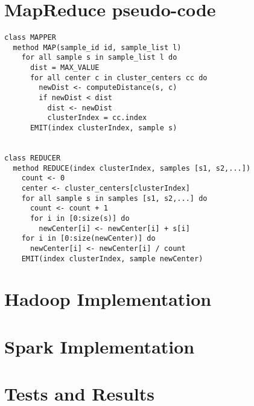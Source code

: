 \documentclass[a4paper, oneside]{article}
\begin{document}
\section{MapReduce pseudo-code}
\begin{verbatim}
class MAPPER
  method MAP(sample_id id, sample_list l)
    for all sample s in sample_list l do
      dist = MAX_VALUE
      for all center c in cluster_centers cc do
        newDist <- computeDistance(s, c)
        if newDist < dist
          dist <- newDist
          clusterIndex = cc.index
      EMIT(index clusterIndex, sample s)


class REDUCER
  method REDUCE(index clusterIndex, samples [s1, s2,...])
    count <- 0
    center <- cluster_centers[clusterIndex]
    for all sample s in samples [s1, s2,...] do
      count <- count + 1
      for i in [0:size(s)] do
        newCenter[i] <- newCenter[i] + s[i]
    for i in [0:size(newCenter)] do
      newCenter[i] <- newCenter[i] / count
    EMIT(index clusterIndex, sample newCenter)
\end{verbatim}

\section{Hadoop Implementation}
\section{Spark Implementation}
\section{Tests and Results}
\end{document}
